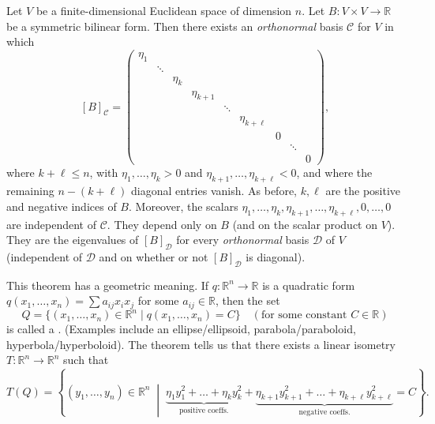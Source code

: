 \begin{theorem}
\label{thm:sylvesters_euclidean}
Let $V$ be a finite-dimensional Euclidean space of dimension $n$. Let $B \colon V \times V \to \mathbb{R}$ be a symmetric bilinear form. Then there exists an \emph{orthonormal} basis $\mathcal{C}$ for $V$ in which
\[
[B]_{\mathcal{C}} = \begin{pmatrix}
\eta_1 & & & & & & & & \\
& \ddots & & & & & & & \\
& & \eta_k & & & & & & \\
& & & \eta_{k+1} & & & & & \\
& & & & \ddots & & & & \\
& & & & & \eta_{k+\ell} & & & \\
& & & & & & 0 & & \\
& & & & & & & \ddots & \\
& & & & & & & & 0
\end{pmatrix},
\]
where $k + \ell \le n$, with $\eta_1, \dots, \eta_k > 0$ and $\eta_{k+1}, \dots, \eta_{k+\ell} < 0$, and where the remaining $n - (k+\ell)$ diagonal entries vanish. As before, $k, \ell$ are the positive and negative indices of $B$. Moreover, the scalars $\eta_1, \dots, \eta_k, \eta_{k+1}, \dots, \eta_{k+\ell}, 0, \dots, 0$ are independent of $\mathcal{C}$. They depend only on $B$ (and on the scalar product on $V$). They are the eigenvalues of $[B]_{\mathcal{D}}$ for every \emph{orthonormal} basis $\mathcal{D}$ of $V$ (independent of $\mathcal{D}$ and on whether or not $[B]_{\mathcal{D}}$ is diagonal).
\end{theorem}

\begin{remark}
This theorem has a geometric meaning.
If $q \colon \mathbb{R}^n \to \mathbb{R}$ is a quadratic form $q(x_1, \dots, x_n) = \sum a_{ij} x_i x_j$ for some $a_{ij} \in \mathbb{R}$, then the set
\[
Q = \{ (x_1, \dots, x_n) \in \mathbb{R}^n \mid q(x_1, \dots, x_n) = C \} \quad (\text{for some constant } C \in \mathbb{R})
\]
is called a . (Examples include an ellipse/ellipsoid, parabola/paraboloid, hyperbola/hyperboloid).
The theorem tells us that there exists a linear isometry $T \colon \mathbb{R}^n \to \mathbb{R}^n$ such that
\[
T(Q) = \left\{ (y_1, \dots, y_n) \in \mathbb{R}^n \;\middle|\; \underbrace{\eta_1 y_1^2 + \dots + \eta_k y_k^2}_{\text{positive coeffs.}} + \underbrace{\eta_{k+1} y_{k+1}^2 + \dots + \eta_{k+\ell} y_{k+\ell}^2}_{\text{negative coeffs.}} = C \right\}.
\]
\end{remark}

